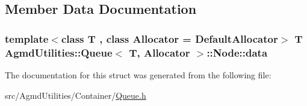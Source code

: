 \subsection{Member Data Documentation}
\hypertarget{struct_agmd_utilities_1_1_queue_1_1_node_a5caf239ddb0acce71a8dd6b26622aa1c}{
\subsubsection[{data}]{\setlength{\rightskip}{0pt plus 5cm}template$<$class T , class Allocator  = Default\+Allocator$>$ T {\bf Agmd\+Utilities\+::\+Queue}$<$ T, {\bf Allocator} $>$\+::Node\+::data}}\label{struct_agmd_utilities_1_1_queue_1_1_node_a5caf239ddb0acce71a8dd6b26622aa1c}


The documentation for this struct was generated from the following file\+:\begin{DoxyCompactItemize}
\item 
src/\+Agmd\+Utilities/\+Container/\hyperlink{_queue_8h}{Queue.\+h}\end{DoxyCompactItemize}
